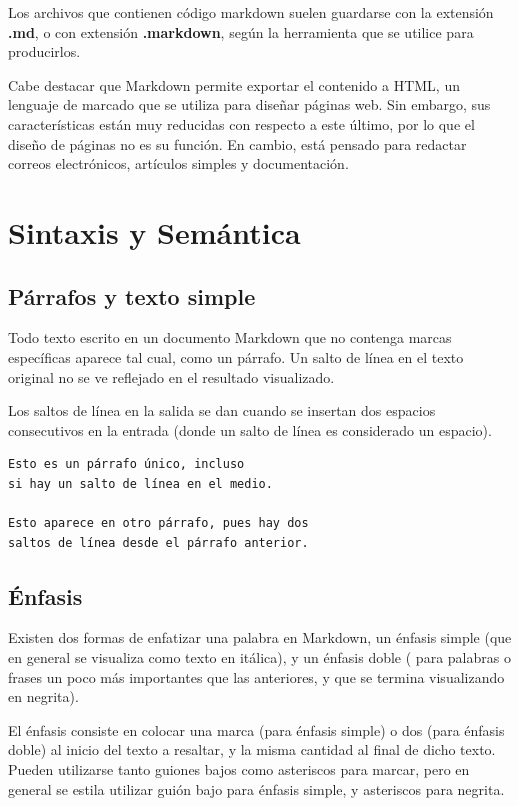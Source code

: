 Los archivos que contienen código markdown suelen guardarse con la extensión
\textbf{.md}, o con extensión \textbf{.markdown}, según la herramienta que se
utilice para producirlos.

Cabe destacar que Markdown permite exportar el contenido a HTML, un lenguaje
de marcado que se utiliza para diseñar páginas web. Sin embargo, sus características
están muy reducidas con respecto a este último, por lo que el diseño de páginas
no es su función. En cambio, está pensado para redactar correos electrónicos,
artículos simples y documentación.

\section{Sintaxis y Semántica}

\subsection*{Párrafos y texto simple}

Todo texto escrito en un documento Markdown que no contenga marcas específicas
aparece tal cual, como un párrafo. Un salto de línea en el texto original
no se ve reflejado en el resultado visualizado.

Los saltos de línea en la salida se dan cuando se insertan dos espacios
consecutivos en la entrada (donde un salto de línea es considerado un espacio).

\begin{lstlisting}[language=Markdown]
Esto es un párrafo único, incluso
si hay un salto de línea en el medio.

Esto aparece en otro párrafo, pues hay dos
saltos de línea desde el párrafo anterior.
\end{lstlisting}

\subsection*{Énfasis}

Existen dos formas de enfatizar una palabra en Markdown, un énfasis simple
(que en general se visualiza como texto en itálica), y un énfasis doble (
para palabras o frases un poco más importantes que las anteriores, y que se
termina visualizando en negrita).

El énfasis consiste en colocar una marca (para énfasis simple) o dos (para énfasis
doble) al inicio del texto a resaltar, y la misma cantidad al final de dicho texto.
Pueden utilizarse tanto guiones bajos como asteriscos para marcar, pero en general
se estila utilizar guión bajo para énfasis simple, y asteriscos para negrita.


